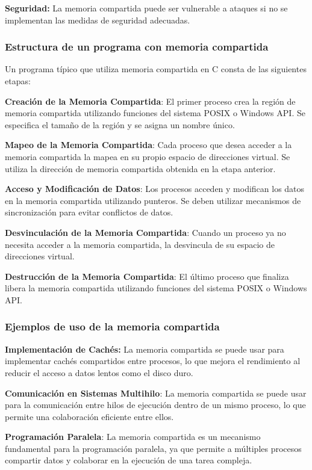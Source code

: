 \textbf{Seguridad:} La memoria compartida puede ser vulnerable a ataques si no se implementan las medidas de seguridad adecuadas.

\subsubsection{Estructura de un programa con memoria compartida}

Un programa típico que utiliza memoria compartida en C consta de las siguientes etapas:

\textbf{Creación de la Memoria Compartida}: El primer proceso crea la región de memoria compartida utilizando funciones del sistema POSIX o Windows API. Se especifica el tamaño de la región y se asigna un nombre único.

\textbf{Mapeo de la Memoria Compartida}: Cada proceso que desea acceder a la memoria compartida la mapea en su propio espacio de direcciones virtual. Se utiliza la dirección de memoria compartida obtenida en la etapa anterior.

\textbf{Acceso y Modificación de Datos}: Los procesos acceden y modifican los datos en la memoria compartida utilizando punteros. Se deben utilizar mecanismos de sincronización para evitar conflictos de datos.

\textbf{Desvinculación de la Memoria Compartida}: Cuando un proceso ya no necesita acceder a la memoria compartida, la desvincula de su espacio de direcciones virtual.

\textbf{Destrucción de la Memoria Compartida}: El último proceso que finaliza libera la memoria compartida utilizando funciones del sistema POSIX o Windows API.

\subsubsection{Ejemplos de uso de la memoria compartida}

\textbf{Implementación de Cachés:} La memoria compartida se puede usar para implementar cachés compartidos entre procesos, lo que mejora el rendimiento al reducir el acceso a datos lentos como el disco duro.

\textbf{Comunicación en Sistemas Multihilo}: La memoria compartida se puede usar para la comunicación entre hilos de ejecución dentro de un mismo proceso, lo que permite una colaboración eficiente entre ellos.

\textbf{Programación Paralela}: La memoria compartida es un mecanismo fundamental para la programación paralela, ya que permite a múltiples procesos compartir datos y colaborar en la ejecución de una tarea compleja.

